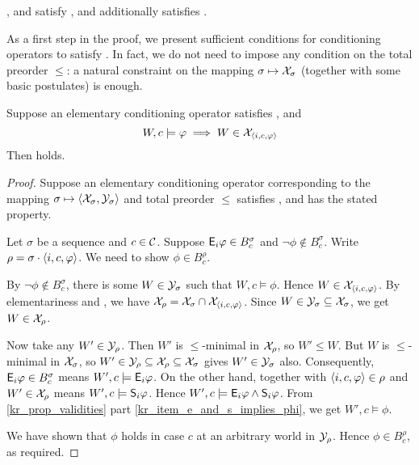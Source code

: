 \begin{proposition}
    \label{kr_prop_examples_satisfy_condsucc}
    \varbasedcond{}, \partbasedcond{} and \scorebasedop{}
    satisfy \condsucc{}, and \scorebasedop{} additionally
    satisfies \strongcondsucc{}.
\end{proposition}

As a first step in the proof, we present sufficient conditions for conditioning
operators to satisfy \condsucc{}. In fact, we do not need to impose any
condition on the total preorder $\le$: a natural constraint on the mapping
$\sigma \mapsto \X_\sigma$ (together with some basic postulates) is enough.

\begin{lemma}
    \label{kr_lemma_conditioning_condsucc_sufficient_condition}
    Suppose an elementary conditioning operator satisfies \kconj{},
    \soundness{} and
    \[
        W, c \models \phi \implies W \in \X_{\tuple{i, c, \phi}}
    \]
    Then \condsucc{} holds.
\end{lemma}

\begin{proof}
    Suppose an elementary conditioning operator corresponding to the mapping
    $\sigma \mapsto \tuple{\X_\sigma, \Y_\sigma}$ and total preorder $\le$
    satisfies \kconj{}, \soundness{} and has the stated property.

    Let $\sigma$ be a sequence and $c \in \C$. Suppose $\E_i\phi \in
    B^\sigma_c$ and $\neg\phi \notin B^\sigma_c$. Write $\rho = \sigma \concat
    \tuple{i, c, \phi}$. We need to show $\phi \in B^\rho_c$.

    By $\neg\phi \notin B^\sigma_c$, there is some $W \in \Y_\sigma$ such that
    $W, c \models \phi$. Hence $W \in \X_{\tuple{i, c, \phi}}$. By
    elementariness and \kconj{}, we have $\X_\rho = \X_\sigma \cap
    \X_{\tuple{i, c, \phi}}$. Since $W \in \Y_\sigma \subseteq \X_\sigma$, we
    get $W \in \X_\rho$.

    Now take any $W' \in \Y_\rho$. Then $W'$ is $\le$-minimal in $\X_\rho$, so
    $W' \le W$. But $W$ is $\le$-minimal in $\X_\sigma$, so $W' \in \Y_\rho
    \subseteq \X_\rho \subseteq \X_\sigma$ gives $W' \in \Y_\sigma$ also.
    Consequently, $\E_i\phi \in B^\sigma_c$ means $W', c \models \E_i\phi$.
    On the other hand, \soundness{} together with $\tuple{i, c, \phi} \in \rho$
    and $W' \in \X_\rho$ means $W', c \models \S_i\phi$. Hence $W', c \models
    \E_i\phi \land \S_i\phi$. From \cref{kr_prop_validities}
    part \cref{kr_item_e_and_s_implies_phi}, we get $W', c \models \phi$.

    We have shown that $\phi$ holds in case $c$ at an arbitrary world in
    $\Y_\rho$. Hence $\phi \in B^\rho_c$, as required.
\end{proof}

